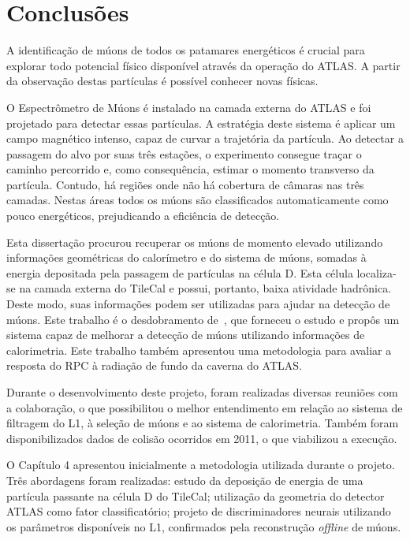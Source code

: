 \chapter{Conclusões}

A identificação de múons de todos os patamares energéticos é crucial para
explorar todo potencial físico disponível através da operação do ATLAS. A partir
da observação destas partículas é possível conhecer novas físicas.

O Espectrômetro de Múons é instalado na camada externa do ATLAS e foi projetado
para detectar essas partículas. A estratégia deste sistema é aplicar um campo
magnético intenso, capaz de curvar a trajetória da partícula. Ao detectar a
passagem do alvo por suas três estações, o experimento consegue traçar o
caminho percorrido e, como consequência, estimar o momento transverso da
partícula. Contudo, há regiões onde não há cobertura de câmaras nas três
camadas. Nestas áreas todos os múons são classificados automaticamente como
pouco energéticos, prejudicando a eficiência de detecção.

Esta dissertação procurou recuperar os múons de momento elevado utilizando
informações geométricas do calorímetro e do sistema de múons, somadas à energia
depositada pela passagem de partículas na célula D. Esta célula localiza-se na
camada externa do TileCal e possui, portanto, baixa atividade hadrônica. Deste
modo, suas informações podem ser utilizadas para ajudar na detecção de múons.
Este trabalho é o desdobramento de~\cite{CIODARO2010}, que forneceu o estudo e
propôs um sistema capaz de melhorar a detecção de múons utilizando informações
de calorimetria. Este trabalho também apresentou uma metodologia para avaliar a
resposta do RPC à radiação de fundo da caverna do ATLAS.

Durante o desenvolvimento deste projeto, foram realizadas diversas reuniões com
a colaboração, o que possibilitou o melhor entendimento em relação ao sistema de
filtragem do L1, à seleção de múons e ao sistema de calorimetria. Também foram
disponibilizados dados de colisão ocorridos em 2011, o que viabilizou a
execução.

O Capítulo 4 apresentou inicialmente a metodologia utilizada durante o projeto.
Três abordagens foram realizadas:  estudo da deposição de energia de uma
partícula passante na célula D do TileCal; utilização da geometria do detector
ATLAS como fator classificatório; projeto de discriminadores neurais
utilizando os parâmetros disponíveis no L1, confirmados pela reconstrução
\emph{offline} de múons.

